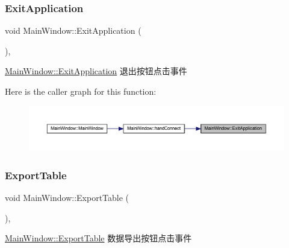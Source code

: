 \subsubsection{\texorpdfstring{ExitApplication}{ExitApplication}}
{\footnotesize\ttfamily void Main\+Window\+::\+Exit\+Application (\begin{DoxyParamCaption}{ }\end{DoxyParamCaption})\hspace{0.3cm}{\ttfamily [private]}, {\ttfamily [slot]}}



\mbox{\hyperlink{class_main_window_a45f9088074a2cb76009c6a7f047fbace}{Main\+Window\+::\+Exit\+Application}} 退出按钮点击事件 

Here is the caller graph for this function\+:
\nopagebreak
\begin{figure}[H]
\begin{center}
\leavevmode
\includegraphics[width=350pt]{class_main_window_a45f9088074a2cb76009c6a7f047fbace_icgraph}
\end{center}
\end{figure}
\mbox{\label{class_main_window_af225d8bd24ccc47792010109b928f6ba}} 
\subsubsection{\texorpdfstring{ExportTable}{ExportTable}}
{\footnotesize\ttfamily void Main\+Window\+::\+Export\+Table (\begin{DoxyParamCaption}{ }\end{DoxyParamCaption})\hspace{0.3cm}{\ttfamily [private]}, {\ttfamily [slot]}}



\mbox{\hyperlink{class_main_window_af225d8bd24ccc47792010109b928f6ba}{Main\+Window\+::\+Export\+Table}} 数据导出按钮点击事件 

